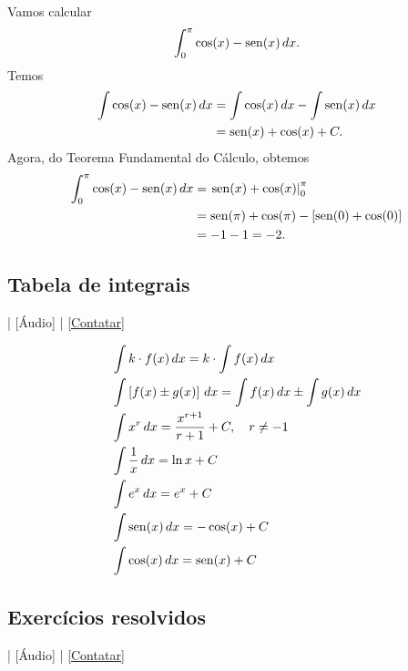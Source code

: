 \begin{ex}
  Vamos calcular
  \begin{equation}
    \int_0^{\pi} \cos(x) - \operatorname{sen}(x)\,dx.
  \end{equation}
  Temos
  \begin{align}
    \int \cos(x)-\operatorname{sen}(x)\,dx &= \int\cos(x)\,dx - \int\operatorname{sen}(x)\,dx\\
                             &= \operatorname{sen}(x) + \cos(x) + C.
  \end{align}
  Agora, do Teorema Fundamental do Cálculo, obtemos
  \begin{align}
    \int_0^{\pi} \cos(x)-\operatorname{sen}(x)\,dx &= \left.\operatorname{sen}(x) + \cos(x)\right|_0^\pi \\
                             &= \operatorname{sen}(\pi)+\cos(\pi) - \left[\operatorname{sen}(0)+\cos(0)\right]\\
                             &= -1 - 1 = -2.
  \end{align}
\end{ex}


\subsection{Tabela de integrais}

\begin{flushright}
  [Vídeo] | [Áudio] | \href{https://phkonzen.github.io/notas/contato.html}{[Contatar]}
\end{flushright}

\begin{small}
\begin{align}
  & \int k\cdot f(x)\,dx = k\cdot\int f(x)\,dx\\
  & \int \left[f(x)\pm g(x)\right]\,dx = \int f(x)\,dx \pm \int g(x)\,dx\\
  & \int x^r\,dx = \frac{x^{r+1}}{r+1} + C,\quad r\neq -1\\
  & \int \frac{1}{x}\,dx = \ln x + C \\
  & \int e^x\,dx = e^x + C \\
  & \int \operatorname{sen}(x)\,dx = -\cos(x) + C \\
  & \int \cos(x)\,dx = \operatorname{sen}(x) + C
\end{align}
\end{small}

\subsection*{Exercícios resolvidos}

\begin{flushright}
  [Vídeo] | [Áudio] | \href{https://phkonzen.github.io/notas/contato.html}{[Contatar]}
\end{flushright}


